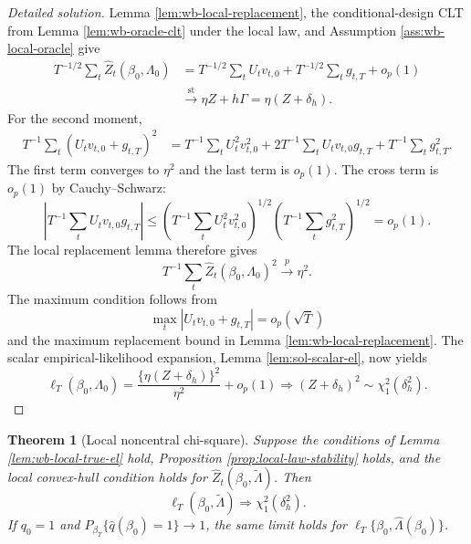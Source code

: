\documentclass[12pt]{article}
\numberwithin{equation}{section}
\newtheorem{theorem}{Theorem}
\theoremstyle{definition}
\begin{document}
\begin{proof}[Detailed solution]
Lemma \ref{lem:wb-local-replacement}, the conditional-design CLT from Lemma
\ref{lem:wb-oracle-clt} under the local law, and Assumption
\ref{ass:wb-local-oracle} give
\begin{align*}
    T^{-1/2}\sum_t\widehat Z_t(\beta_0,\Lambda_0)
    &=T^{-1/2}\sum_tU_tv_{t,0}
      +T^{-1/2}\sum_tg_{t,T}+o_p(1)\\
    &\xrightarrow{\mathrm{st}}\eta Z+h\Gamma
      =\eta(Z+\delta_h).
\end{align*}
For the second moment,
\begin{align*}
    T^{-1}\sum_t(U_tv_{t,0}+g_{t,T})^2
    &=T^{-1}\sum_tU_t^2v_{t,0}^2
      +2T^{-1}\sum_tU_tv_{t,0}g_{t,T}
      +T^{-1}\sum_tg_{t,T}^2.
\end{align*}
The first term converges to \(\eta^2\) and the last term is \(o_p(1)\).
The cross term is \(o_p(1)\) by Cauchy--Schwarz:
\[
    \left|T^{-1}\sum_tU_tv_{t,0}g_{t,T}\right|
    \leq
    \left(T^{-1}\sum_tU_t^2v_{t,0}^2\right)^{1/2}
    \left(T^{-1}\sum_tg_{t,T}^2\right)^{1/2}=o_p(1).
\]
The local replacement lemma therefore gives
\[
    T^{-1}\sum_t\widehat Z_t(\beta_0,\Lambda_0)^2
    \xrightarrow{p}\eta^2.
\]
The maximum condition follows from
\[
    \max_t|U_tv_{t,0}+g_{t,T}|=o_p(\sqrt T)
\]
and the maximum replacement bound in Lemma \ref{lem:wb-local-replacement}.
The scalar empirical-likelihood expansion, Lemma \ref{lem:sol-scalar-el}, now
yields
\[
    \ell_T(\beta_0,\Lambda_0)
    =\frac{\{\eta(Z+\delta_h)\}^2}{\eta^2}+o_p(1)
    \Rightarrow (Z+\delta_h)^2\sim\chi_1^2(\delta_h^2).
\]
\end{proof}


\begin{theorem}[Local noncentral chi-square]
\label{thm:wb-local-power}
Suppose the conditions of Lemma \ref{lem:wb-local-true-el} hold, Proposition
\ref{prop:local-law-stability} holds, and the local convex-hull condition holds
for \(\widehat Z_t(\beta_0,\widetilde\Lambda)\).  Then
\[
    \ell_T(\beta_0,\widetilde\Lambda)
    \Rightarrow
    \chi_1^2(\delta_h^2).
\]
If \(q_0=1\) and \(P_{\beta_T}\{\widehat q(\beta_0)=1\}\to1\), the same
limit holds for \(\ell_T\{\beta_0,\widehat\Lambda(\beta_0)\}\).
\end{theorem}
\end{document}
